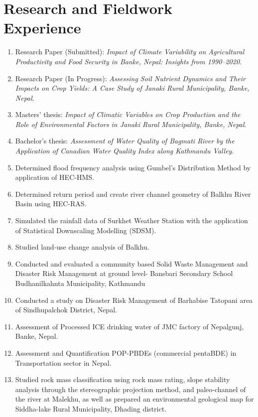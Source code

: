 \documentclass[a4paper,10pt]{article}
\begin{document}
\section{Research and Fieldwork Experience}
\begin{enumerate}
    \item Research Paper (Submitted): \textit{Impact of Climate Variability on Agricultural Productivity and Food Security in Banke, Nepal: Insights from 1990--2020}.
    \item Research Paper (In Progress): \textit{Assessing Soil Nutrient Dynamics and Their Impacts on Crop Yields: A Case Study of Janaki Rural Municipality, Banke, Nepal}.
    \item Masters’ thesis: \textit{Impact of Climatic Variables on Crop Production and the Role of Environmental Factors in Janaki Rural Municipality, Banke, Nepal}.
    \item Bachelor's thesis: \textit{Assessment of Water Quality of Bagmati River by the Application of Canadian Water Quality Index along Kathmandu Valley}.
    \item Determined flood frequency analysis using Gumbel’s Distribution Method by application of HEC-HMS.
    \item Determined return period and create river channel geometry of Balkhu River Basin using HEC-RAS.
    \item Simulated the rainfall data of Surkhet Weather Station with the application of Statistical Downscaling Modelling (SDSM).
    \item Studied land-use change analysis of Balkhu.
    \item Conducted and evaluated a community based Solid Waste Management and Disaster Risk Management at ground level- Bansbari Secondary School Budhanilkahnta Municipality, Kathmandu
    \item Conducted a study on Disaster Risk Management of Barhabise Tatopani area of Sindhupalchok District, Nepal.
    \item Assessment of Processed ICE drinking water of JMC factory
    of Nepalgunj, Banke, Nepal.
    \item Assessment and Quantification POP-PBDEs (commercial pentaBDE) in Transportation sector in Nepal.
    \item Studied rock mass classification using rock mass rating, slope stability analysis through the  stereographic projection method, and paleo-channel of the river at Malekhu, as well as prepared an environmental geological map for Siddha-lake Rural Municipality, Dhading district.

\end{enumerate}
\end{document}
